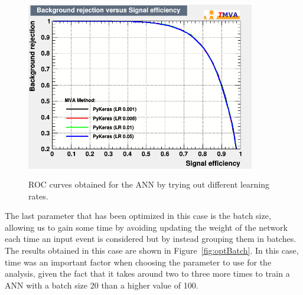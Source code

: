 \documentclass[a4paper, 10pt, openright]{report}
\begin{document}
\begin{appendices}
\begin{figure}[htbp]
\centering
\includegraphics[width=10cm, height=8cm]{figs/DNN_rates.png}
\caption{\ac{ROC} curves obtained for the \ac{ANN} by trying out different learning rates.}
\label{fig:optLearning}
\end{figure}

The last parameter that has been optimized in this case is the batch size, allowing us to gain some time by avoiding updating the weight of the network each time an input event is considered but by instead grouping them in batches. The results obtained in this case are shown in Figure~\ref{fig:optBatch}. In this case, time was an important factor when choosing the parameter to use for the analysis, given the fact that it takes around two to three more times to train a \ac{ANN} with a batch size 20 than a higher value of 100.



\end{appendices}
\end{document}

